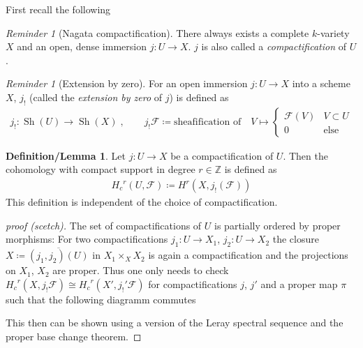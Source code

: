 \documentclass[english]{scrartcl}
\theoremstyle{definition}
\newtheorem{DefLem}[Def]{Definition/Lemma}
\theoremstyle{remark}
\newtheorem{Rev}[Def]{Reminder}
\newcommand*{\Z}{\mathds{Z}}
\newcommand*{\F}{\mathcal{F}} %
\DeclareMathOperator{\Sh}{Sh} %
\newcommand*{\Hc}{{H_c}} %
\begin{document}
First recall the following
\begin{Rev}[Nagata compactification]\label{nagata}
  There always exists a complete $k$-variety $X$ and an open, dense
  immersion $j\colon U\to X$. $j$ is also called a
  \emph{compactification} of $U$.
\end{Rev}
\begin{Rev}[Extension by zero]\label{def:extbyzero}
  For an open immersion $j\colon U\to X$ into
  a scheme $X$, $j_!$ (called the \emph{extension by zero} of $j$)
  is defined as
  \begin{gather*}
    j_!\colon \Sh(U)\to \Sh(X)\;,\qquad
    j_!\F \coloneqq \text{sheafification of}\quad
    V\mapsto\begin{cases}
      \F(V) & V\subset U\\
      0     & \text{else}
    \end{cases}
  \end{gather*}
\end{Rev}

\begin{DefLem}\label{def:cptcohomology}
  Let $j\colon U\to X$ be a compactification of $U$. Then the
  cohomology with compact support in degree $r\in\Z$ is defined as
  \begin{gather*}
    \Hc^r(U,\F) \coloneqq H^r(X,j_!(\F))
  \end{gather*}
  This definition is independent of the choice of compactification.
  \begin{proof}[proof (scetch)]
    The set of compactifications of $U$ is partially ordered by proper
    morphisms:
    For two compactifications $j_1\colon U\to X_1$,
    $j_2\colon U\to X_2$ the closure
    $X\coloneqq\overline{(j_1,j_2)(U)}$ in $X_1\times_X X_2$ is again
    a compactification and the projections on $X_1$, $X_2$ are proper.
    Thus one only needs to check $\Hc^r(X,j_!\F)\cong\Hc^r(X',j_!'\F)$
    for compactifications $j$, $j'$ and a proper map $\pi$ such that
    the following diagramm commutes
    \begin{center}
    \end{center}
    This then can be shown using a version of the Leray spectral
    sequence and the proper base change theorem.
  \end{proof}
\end{DefLem}
\end{document}
